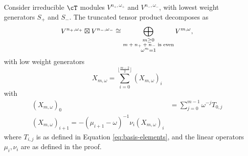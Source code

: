 \documentclass[12pt]{article}
\begin{document}
\begin{thm}
Consider irreducible $\cT$ modules $V^{n_+, \omega_+}$ and $V^{n_-, \omega_-}$, with lowest weight generators $S_+$ and $S_-$.
The truncated tensor product decomposes as
$$
V^{n_+, \omega_+} \boxtimes V^{n_-, \omega_-} 
\cong 
\bigoplus_{\substack{m \geq 0 \\ \text{$m + n_+  + n_-$ is even} \\ \omega^m = 1}} V^{m, \omega},
$$
with low weight generators 
$$
X_{m, \omega} 
= 
\sum_{i=0}^{\lfloor\frac{m-2}{2}\rfloor}
\left(X_{m,\omega}\right)_i
$$
with
\begin{align*}
\left(X_{m,\omega}\right)_0 & =  \sum_{j=0}^{m-1} \omega^{-j} T_{0,j} \\
\left(X_{m,\omega}\right)_{i+1} = - (\mu_{i+1} - \omega)^{-1} \nu_i \left(X_{m,\omega}\right)_i
\end{align*}
where $T_{i,j}$ is as defined in Equation \eqref{eq:basis-elements}, and the linear operators $\mu_i, \nu_i$ are as defined in the proof.
\end{thm}
\end{document}
